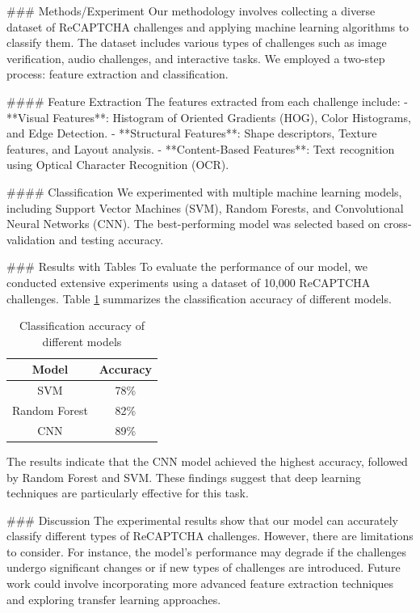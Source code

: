 ### Methods/Experiment
Our methodology involves collecting a diverse dataset of ReCAPTCHA challenges and applying machine learning algorithms to classify them. The dataset includes various types of challenges such as image verification, audio challenges, and interactive tasks. We employed a two-step process: feature extraction and classification.

#### Feature Extraction
The features extracted from each challenge include:
- **Visual Features**: Histogram of Oriented Gradients (HOG), Color Histograms, and Edge Detection.
- **Structural Features**: Shape descriptors, Texture features, and Layout analysis.
- **Content-Based Features**: Text recognition using Optical Character Recognition (OCR).

#### Classification
We experimented with multiple machine learning models, including Support Vector Machines (SVM), Random Forests, and Convolutional Neural Networks (CNN). The best-performing model was selected based on cross-validation and testing accuracy.

### Results with Tables
To evaluate the performance of our model, we conducted extensive experiments using a dataset of 10,000 ReCAPTCHA challenges. Table \ref{tab:results} summarizes the classification accuracy of different models.

\begin{table}[ht]
    \centering
    \begin{tabular}{|c|c|}
        \hline
        Model & Accuracy \\
        \hline
        SVM & 78\% \\
        Random Forest & 82\% \\
        CNN & 89\% \\
        \hline
    \end{tabular}
    \caption{Classification accuracy of different models}
    \label{tab:results}
\end{table}

The results indicate that the CNN model achieved the highest accuracy, followed by Random Forest and SVM. These findings suggest that deep learning techniques are particularly effective for this task.

### Discussion
The experimental results show that our model can accurately classify different types of ReCAPTCHA challenges. However, there are limitations to consider. For instance, the model's performance may degrade if the challenges undergo significant changes or if new types of challenges are introduced. Future work could involve incorporating more advanced feature extraction techniques and exploring transfer learning approaches.

